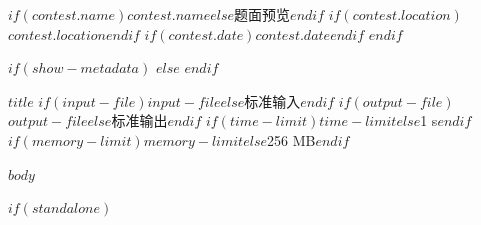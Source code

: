 \documentclass[12pt,a4paper,oneside]{ctexart}
\begin{document}
\contest
{$if(contest.name)$$contest.name$$else$题面预览$endif$}%
{$if(contest.location)$$contest.location$$endif$}%
{$if(contest.date)$$contest.date$$endif$}
$endif$

\begingroup

\providecommand{\tightlist}{%
  \setlength{\itemsep}{0pt}\setlength{\parskip}{0pt}}
\providecommand{\pandocbounded}[1]{#1}
\providecommand{\href}[2]{#2}

$if(show-metadata)$
\let\NoInputFileName\undefined
\let\NoOutputFileName\undefined
\let\NoTimeLimit\undefined
\let\NoMemoryLimit\undefined
$else$
\def\NoInputFileName{}
\def\NoOutputFileName{}
\def\NoTimeLimit{}
\def\NoMemoryLimit{}
$endif$

\begin{problem}
{$title$}%
{$if(input-file)$$input-file$$else$标准输入$endif$}%
{$if(output-file)$$output-file$$else$标准输出$endif$}%
{$if(time-limit)$$time-limit$$else$1 s$endif$}%
{$if(memory-limit)$$memory-limit$$else$256 MB$endif$}

$body$

\end{problem}
\endgroup
$if(standalone)$
\end{document}
